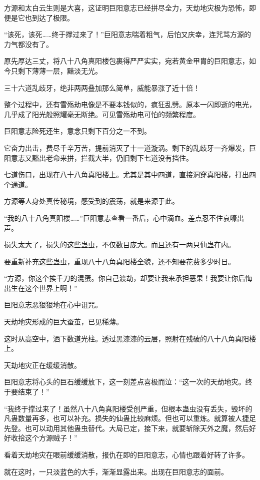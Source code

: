 \begin{this_body}
方源和太白云生则是大喜，这证明巨阳意志已经拼尽全力，天劫地灾极为恐怖，即便是它也到达了极限。

“该死，该死……终于撑过来了！”巨阳意志喘着粗气，后怕又庆幸，连咒骂方源的力气都没有了。

原先厚达三丈，将八十八角真阳楼包裹得严严实实，宛若黄金甲胄的巨阳意志，如今只剩下薄薄一层，黯淡无光。

三十六道乱歧牙，绝非两两叠加那么简单，威能暴涨了近十倍！

整个过程中，还有雪殇劫电像是不要本钱似的，疯狂乱劈。原本一闪即逝的电光，几乎成了阳光般照耀毫无断绝。可见雪殇劫电可怕的频繁程度。

巨阳意志险死还生，意念只剩下百分之一不到。

它奋力出击，费尽千辛万苦，提前消灭了十一道漩涡。剩下的乱歧牙一齐爆发，巨阳意志又豁出老命来拼，拦截大半，仍旧剩下七道没有挡住。

七道伤口，出现在八十八角真阳楼上。尤其是其中四道，直接洞穿真阳楼，打出四个通道。

方源等人身处真传秘境，感受到的震荡，就是来源于此。

“我的八十八角真阳楼……”巨阳意志查看一番后，心中滴血。差点忍不住哀嚎出声。

损失太大了，损失的这些蛊虫，不仅数目庞大。而且还有一两只仙蛊在内。

要重新补充这些蛊虫，重现八十八角真阳楼全貌，还不知要花费多少时日。

“方源，你这个挨千刀的混蛋。你自己渡劫，却要让我来承担恶果！我要让你后悔出生在这个世界上啊！”

巨阳意志恶狠狠地在心中诅咒。

天劫地灾形成的巨大蚕茧，已见稀薄。

这时从高空中，洒下数道光柱。透过黑漆漆的云层，照射在残破的八十八角真阳楼上。

天劫地灾正在缓缓消散。

巨阳意志将心头的巨石缓缓放下，这一刻差点喜极而泣：“这一次的天劫地灾。终于要结束了！”

“我终于撑过来了！虽然八十八角真阳楼受创严重，但根本蛊虫没有丢失，毁坏的凡蛊数量再多，也可以补充。损失的仙蛊比较麻烦。但也可以重炼。就算被人捷足先登。也可以动用其他蛊虫替代。大局已定，接下来，就要斩除天外之魔，然后好好收拾这个方源贼子！”

看着天劫地灾在眼前缓缓消散，报仇在即的巨阳意志，心情也跟着好转了许多。

就在这时，一只淡蓝色的大手，渐渐显露出来。出现在巨阳意志的面前。


\end{this_body}
